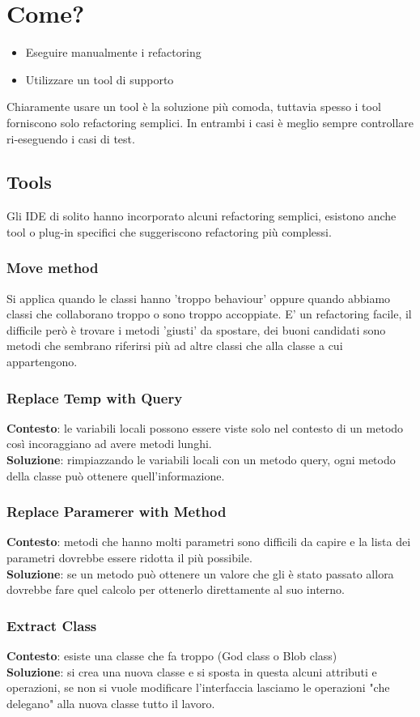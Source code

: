 \documentclass[12pt, a4paper]{report}
\begin{document}
\section{Come?}
\begin{itemize}
    \item Eseguire manualmente i refactoring
    \item Utilizzare un tool di supporto
\end{itemize}
Chiaramente usare un tool è la soluzione più comoda, tuttavia spesso i tool forniscono solo refactoring semplici. In entrambi i casi è meglio sempre controllare ri-eseguendo i casi di test.
\subsection{Tools}
Gli IDE di solito hanno incorporato alcuni refactoring semplici, esistono anche tool o plug-in specifici che suggeriscono refactoring più complessi.
\subsubsection{Move method}
Si applica quando le classi hanno 'troppo behaviour' oppure quando abbiamo classi che collaborano troppo o sono troppo accoppiate. E' un refactoring facile, il difficile però è trovare i metodi 'giusti' da spostare, dei buoni candidati sono metodi che sembrano riferirsi più ad altre classi che alla classe a cui appartengono.
\subsubsection{Replace Temp with Query}
\textbf{Contesto}: le variabili locali possono essere viste solo nel contesto di un metodo così incoraggiano ad avere metodi lunghi.\\
\textbf{Soluzione}: rimpiazzando le variabili locali con un metodo query, ogni metodo della classe può ottenere quell'informazione.
\subsubsection{Replace Paramerer with Method}
\textbf{Contesto}: metodi che hanno molti parametri sono difficili da capire e la lista dei parametri dovrebbe essere ridotta il più possibile.\\
\textbf{Soluzione}: se un metodo può ottenere un valore che gli è stato passato allora dovrebbe fare quel calcolo per ottenerlo direttamente al suo interno.
\subsubsection{Extract Class}
\textbf{Contesto}: esiste una classe che fa troppo (God class o Blob class)\\
\textbf{Soluzione}: si crea una nuova classe e si sposta in questa alcuni attributi e operazioni, se non si vuole modificare l'interfaccia lasciamo le operazioni "che delegano" alla nuova classe tutto il lavoro.
\end{document}
